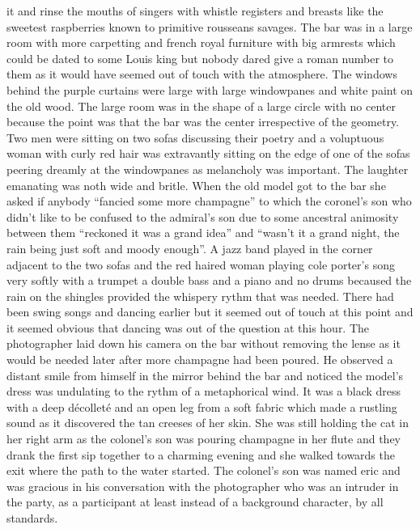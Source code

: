 it and rinse the mouths of singers with whistle registers and breasts like the
sweetest raspberries known to primitive rousseans savages. The bar was in a
large room with more carpetting and french royal furniture with big armrests
which could be dated to some Louis king but nobody dared give a roman number to
them as it would have seemed out of touch with the atmosphere. The windows
behind the purple curtains were large with large windowpanes and white paint on
the old wood. The large room was in the shape of a large circle with no center
because the point was that the bar was the center irrespective of the geometry.
Two men were sitting on two sofas discussing their poetry and a voluptuous
woman with curly red hair was extravantly sitting on the edge of one of the
sofas peering dreamly at the windowpanes as melancholy was important. The
laughter emanating was noth wide and britle. When the old model got to the bar
she asked if anybody “fancied some more champagne” to which the coronel’s son
who didn’t like to be confused to the admiral’s son due to some ancestral
animosity between them  “reckoned it was a grand idea” and “wasn’t it a grand
night, the rain being just soft and moody enough”. A jazz band played in the
corner adjacent to the two sofas and the red haired woman playing cole porter’s
song very softly with a trumpet a double bass and a piano and no drums becaused
the rain on the shingles provided the whispery rythm that was needed. There had
been swing songs and dancing earlier but it seemed out of touch at this point
and it seemed obvious that dancing was out of the question at this hour. The
photographer laid down his camera on the bar without removing the lense as it
would be needed later after more champagne had been poured. He observed a
distant smile from himself in the mirror behind the bar and noticed the model’s
dress was undulating to the rythm of a metaphorical wind. It was a black dress
with a deep décolleté and an open leg from a soft fabric which made a rustling
sound as it discovered the tan creeses of her skin. She was still holding the
cat in her right arm as the colonel’s son was pouring champagne in her flute
and they drank the first sip together to a charming evening and she walked
towards the exit where the path to the water started. The colonel’s son was
named eric and was gracious in his conversation with the photographer who was
an intruder in the party, as a participant at least instead of a background
character, by all standards. 

